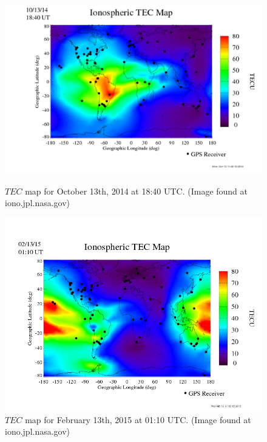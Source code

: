 \begin{figure}[htb]
\centering
\begin{minipage}[b]{0.48\textwidth}
\centering
\includegraphics[width=0.95\linewidth]{Ionosphere/figures/TEC_map_20141013_18-40UT.png}
\caption{$TEC$ map for October 13th, 2014 at 18:40 UTC. (Image found at iono.jpl.nasa.gov)  }
\label{Fig:fall_tec_global}
\end{minipage}%
\begin{minipage}[b]{0.02\textwidth}
\hspace{1cm}
\end{minipage}%
\begin{minipage}[b]{0.48\textwidth}
\centering
\includegraphics[width=0.95\linewidth]{Ionosphere/figures/TEC_map_20150213_01-10UT.png}
\caption{$TEC$ map for February 13th, 2015 at 01:10 UTC. (Image found at iono.jpl.nasa.gov)  }
\label{Fig:winter_tec_global}
\end{minipage}
\end{figure}


